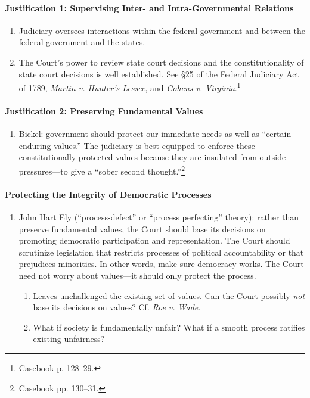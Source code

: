 \paragraph{Justification 1: Supervising Inter- and Intra-Governmental 
Relations}

\begin{enumerate}
    \item Judiciary oversees interactions within the federal government and 
    between the federal government and the states.
    \item The Court's power to review state court decisions and the 
    constitutionality of state court decisions is well established. See \S 25 
    of the Federal Judiciary Act of 1789, \emph{Martin v. Hunter's Lessee}, 
    and \emph{Cohens v. Virginia}.\footnote{Casebook p. 128--29.}
\end{enumerate}

\paragraph{Justification 2: Preserving Fundamental Values}

\begin{enumerate}
    \item Bickel: government should protect our immediate needs as well as 
    ``certain enduring values.'' The judiciary is best equipped to enforce 
    these constitutionally protected values because they are insulated from 
    outside pressures---to give a ``sober second thought.''\footnote{Casebook 
    pp. 130--31.}
\end{enumerate}

\paragraph{Protecting the Integrity of Democratic Processes}

\begin{enumerate}
    \item John Hart Ely (``process-defect'' or ``process perfecting'' theory): 
    rather than preserve fundamental values, the Court should base its 
    decisions on promoting democratic participation and representation. The 
    Court should scrutinize legislation that restricts processes of political 
    accountability or that prejudices minorities. In other words, make sure 
    democracy works.  The Court need not worry about values---it should only 
    protect the process.
    \begin{enumerate}
        \item Leaves unchallenged the existing set of values. Can the Court 
        possibly \emph{not} base its decisions on values? Cf. \emph{Roe v. 
        Wade}.
        \item What if society is fundamentally unfair? What if a smooth 
        process ratifies existing unfairness?
    \end{enumerate}
\end{enumerate}

